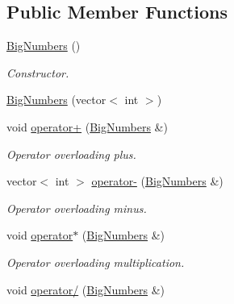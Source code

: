\subsection*{Public Member Functions}
\begin{DoxyCompactItemize}
\item 
\mbox{\hyperlink{classBigNumbers_af3dd82883f10f3473ac83280f26b0ad8}{Big\+Numbers}} ()
\begin{DoxyCompactList}\small\item\em Constructor. \end{DoxyCompactList}\item 
\mbox{\hyperlink{classBigNumbers_a1bdf450fbccb23f66ac642fdd54126ee}{Big\+Numbers}} (vector$<$ int $>$)
\item 
\mbox{\label{classBigNumbers_ad32417ecab79a88474e1b1f10b1eb85f}} 
void \mbox{\hyperlink{classBigNumbers_ad32417ecab79a88474e1b1f10b1eb85f}{operator+}} (\mbox{\hyperlink{classBigNumbers}{Big\+Numbers}} \&)
\begin{DoxyCompactList}\small\item\em Operator overloading plus. \end{DoxyCompactList}\item 
\mbox{\label{classBigNumbers_a24ae2be2196b1687e9fc7743e04550b6}} 
vector$<$ int $>$ \mbox{\hyperlink{classBigNumbers_a24ae2be2196b1687e9fc7743e04550b6}{operator-\/}} (\mbox{\hyperlink{classBigNumbers}{Big\+Numbers}} \&)
\begin{DoxyCompactList}\small\item\em Operator overloading minus. \end{DoxyCompactList}\item 
\mbox{\label{classBigNumbers_a4de528bfd05e549f753ccd0523734d7b}} 
void \mbox{\hyperlink{classBigNumbers_a4de528bfd05e549f753ccd0523734d7b}{operator$\ast$}} (\mbox{\hyperlink{classBigNumbers}{Big\+Numbers}} \&)
\begin{DoxyCompactList}\small\item\em Operator overloading multiplication. \end{DoxyCompactList}\item 
\mbox{\label{classBigNumbers_a0579c6282085fb4638b65f78c2bb68ab}} 
void \mbox{\hyperlink{classBigNumbers_a0579c6282085fb4638b65f78c2bb68ab}{operator/}} (\mbox{\hyperlink{classBigNumbers}{Big\+Numbers}} \&)

\end{DoxyCompactItemize}
